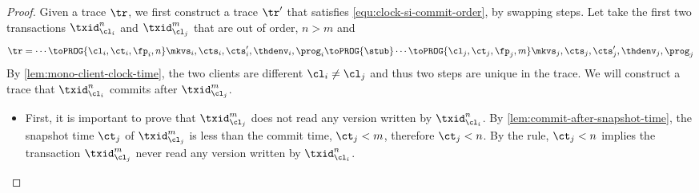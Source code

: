 \begin{proof}
    Given a trace \( \tr \), we first construct a trace \( \tr' \)  that satisfies \cref{equ:clock-si-commit-order}, by swapping steps.
    Let take the first two transactions \( \txid_{\cl_i}^n \) and \( \txid_{\cl_j}^m \) that are out of order, \ie \( n > m \) and 
    \[
    \begin{array}{@{}l@{}}
        \tr = \cdots \toPROG{\cl_i,\ct_i,\fp_i,n} \mkvs_i, \cts_i, \cts'_i, \thdenv_i, \prog_i \toPROG{\stub}  \cdots \toPROG{\cl_j,\ct_j,\fp_j,m} \mkvs_j, \cts_j, \cts'_j, \thdenv_j, \prog_j \\
    \end{array}
    \]
    By \cref{lem:mono-client-clock-time}, the two clients are different \( \cl_i \neq \cl_j \) and thus two steps are unique in the trace.
    We will construct a trace that \( \txid_{\cl_i}^n \) commits after \( \txid_{\cl_j}^m  \).
    \begin{itemize}
    \item First, it is important to prove that \( \txid_{\cl_j}^m \) does not read any version written by \( \txid_{\cl_i}^n\).
    By \cref{lem:commit-after-snapshot-time}, the snapshot time \( \ct_j \) of \( \txid_{\cl_j}^m \) is less than the commit time, 
    \ie \( \ct_j < m \), therefore \( \ct_j < n \).                                                                                  
    By the  rule, \( \ct_j < n \) implies the transaction \( \txid_{\cl_j}^m \) never read any version written by \( \txid_{\cl_i}^n \).


\end{itemize}
\end{proof}

